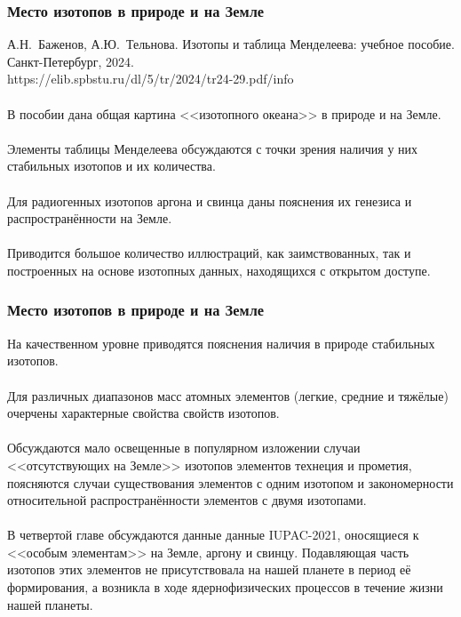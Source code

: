 \documentclass{beamer}
\begin{document}
\begin{frame}
	\frametitle{Место изотопов в природе и на Земле}
А.Н.~Баженов, А.Ю.~Тельнова.	Изотопы и таблица Менделеева: учебное пособие. Санкт-Петербург, 2024.\\
https://elib.spbstu.ru/dl/5/tr/2024/tr24-29.pdf/info\\
~\\
	В пособии дана общая картина <<изотопного океана>> в природе и на Земле. \\
~\\
Элементы таблицы Менделеева обсуждаются с точки зрения наличия у них стабильных изотопов и их количества.
\\
~\\
Для радиогенных изотопов аргона и свинца даны пояснения их генезиса и распространённости на Земле.
\\
~\\
Приводится большое количество иллюстраций, как заимствованных, так и построенных на основе изотопных данных, находящихся с открытом доступе.

	
\end{frame}


\begin{frame}
	\frametitle{Место изотопов в природе и на Земле}

	
На качественном уровне приводятся пояснения наличия в природе стабильных изотопов. 
\\
~\\

Для различных диапазонов масс атомных элементов (легкие, средние и тяжёлые) очерчены характерные свойства свойств изотопов.
\\
~\\
Обсуждаются мало освещенные в популярном изложении случаи <<отсутствующих на Земле>> изотопов элементов технеция и прометия,
поясняются случаи существования элементов с одним изотопом и закономерности относительной распространённости элементов с двумя изотопами.
\\
~\\	

В четвертой главе обсуждаются данные данные IUPAC-2021, оносящиеся к <<особым элементам>> на Земле, аргону и свинцу. Подавляющая часть изотопов этих элементов не присутствовала на нашей планете в период её формирования, а возникла в ходе ядернофизических процессов в течение жизни нашей планеты.

	
\end{frame}
\end{document}
